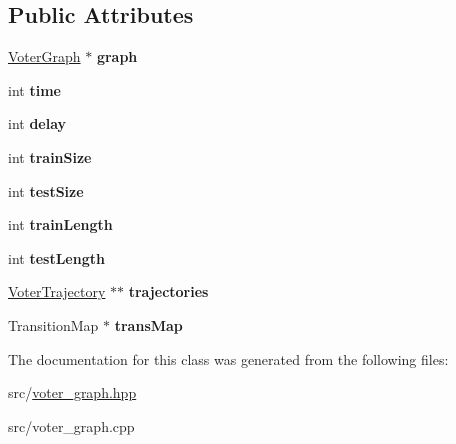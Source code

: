 \subsection*{Public Attributes}
\begin{DoxyCompactItemize}
\item 
\hypertarget{classVoterDataSet_afc4d76589e0112bb5c8e30730074231e}{\hyperlink{classVoterGraph}{Voter\-Graph} $\ast$ {\bfseries graph}}\label{classVoterDataSet_afc4d76589e0112bb5c8e30730074231e}

\item 
\hypertarget{classVoterDataSet_a50a2e44a9d6d99d3254e3da816f76aff}{int {\bfseries time}}\label{classVoterDataSet_a50a2e44a9d6d99d3254e3da816f76aff}

\item 
\hypertarget{classVoterDataSet_a32c0fb1d14c53d2c10a28463f9e44a7f}{int {\bfseries delay}}\label{classVoterDataSet_a32c0fb1d14c53d2c10a28463f9e44a7f}

\item 
\hypertarget{classVoterDataSet_a8aadcc50a4094f7d43f3172c70ae5f73}{int {\bfseries train\-Size}}\label{classVoterDataSet_a8aadcc50a4094f7d43f3172c70ae5f73}

\item 
\hypertarget{classVoterDataSet_a068aae3fc53a52217cc9014ba21090dd}{int {\bfseries test\-Size}}\label{classVoterDataSet_a068aae3fc53a52217cc9014ba21090dd}

\item 
\hypertarget{classVoterDataSet_ad7cb5062b8c67a26ee50939d54027748}{int {\bfseries train\-Length}}\label{classVoterDataSet_ad7cb5062b8c67a26ee50939d54027748}

\item 
\hypertarget{classVoterDataSet_a89ce0e2c44631818736ca7f71056f6c0}{int {\bfseries test\-Length}}\label{classVoterDataSet_a89ce0e2c44631818736ca7f71056f6c0}

\item 
\hypertarget{classVoterDataSet_a07299f2883a8ec069d9821a877351725}{\hyperlink{classVoterTrajectory}{Voter\-Trajectory} $\ast$$\ast$ {\bfseries trajectories}}\label{classVoterDataSet_a07299f2883a8ec069d9821a877351725}

\item 
\hypertarget{classVoterDataSet_a0f0ee88cf6290a0a679982a5fef315b0}{Transition\-Map $\ast$ {\bfseries trans\-Map}}\label{classVoterDataSet_a0f0ee88cf6290a0a679982a5fef315b0}

\end{DoxyCompactItemize}


The documentation for this class was generated from the following files\-:\begin{DoxyCompactItemize}
\item 
src/\hyperlink{voter__graph_8hpp}{voter\-\_\-graph.\-hpp}\item 
src/voter\-\_\-graph.\-cpp\end{DoxyCompactItemize}

